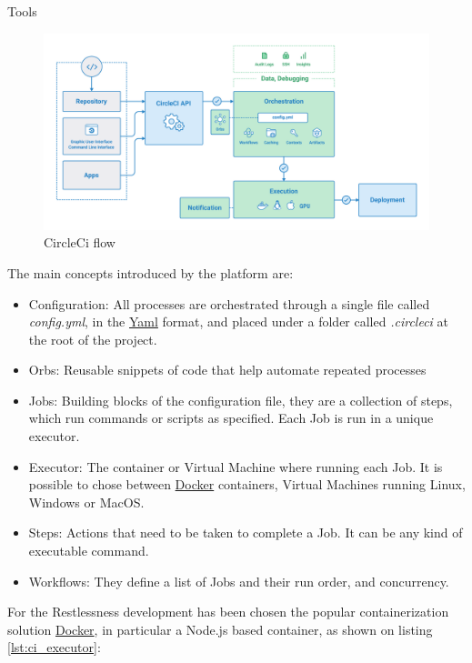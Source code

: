 \begin{chapter}{Tools}
    \begin{figure}
        \centering
        \includegraphics[width=\linewidth]{source/images/circle-ci.png}
        \caption{CircleCi flow \cite{circle_ci_official}}
        \label{fig:circle_ci_structure}
    \end{figure}

    The main concepts introduced by the platform are:
    \begin{itemize}
        \item Configuration: All processes are orchestrated through a single file
            called \textit{config.yml}, in the \href{https://yaml.org/}{Yaml} format,
            and placed under a folder called \textit{.circleci} at the root of the
            project.
        \item Orbs: Reusable snippets of code that help automate repeated processes
        \item Jobs: Building blocks of the configuration file, they are a collection
            of steps, which run commands or scripts as specified. Each Job is run
            in a unique executor.
        \item Executor: The container or Virtual Machine where running each Job.
            It is possible to chose between \href{https://www.docker.com/}{Docker}
            containers, Virtual Machines running Linux, Windows or MacOS.
        \item Steps: Actions that need to be taken to complete a Job. It can be
            any kind of executable command.
        \item Workflows: They define a list of Jobs and their run order, and
            concurrency.
    \end{itemize}

    For the Restlessness development has been chosen the popular containerization
    solution \href{https://www.docker.com/}{Docker}, in particular a Node.js based
    container, as shown on listing \ref{lst:ci_executor}:


\end{chapter}
